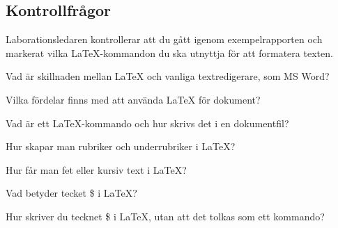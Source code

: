\subsection*{Kontrollfrågor}
\begin{Kontrollfragor}
	\item Laborationsledaren kontrollerar att du gått igenom exempelrapporten och markerat vilka \LaTeX-kommandon du ska utnyttja för att formatera texten.
	\halfblankline

	\item Vad är skillnaden mellan {\LaTeX} och vanliga textredigerare, som MS Word?
	\item Vilka fördelar finns med att använda {\LaTeX} för dokument?
	\item Vad är ett {\LaTeX}-kommando och hur skrivs det i en dokumentfil?
	\item Hur skapar man rubriker och underrubriker i {\LaTeX}?
	\item Hur får man fet eller kursiv text i {\LaTeX}?
	\item Vad betyder tecket \$ i {\LaTeX}?
	\item Hur skriver du tecknet \$ i {\LaTeX}, utan att det tolkas som ett kommando?

\end{Kontrollfragor}

